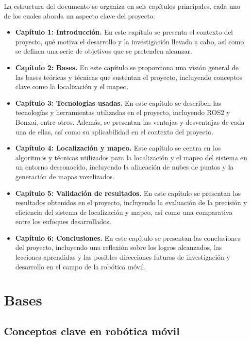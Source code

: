 \documentclass[12pt, a4paper, twoside]{article}
\begin{document}
La estructura del documento se organiza en seis capítulos principales, cada uno de los cuales aborda un aspecto clave del proyecto:
\begin{itemize}
  \item \textbf{Capítulo 1: Introducción.} En este capítulo se presenta el contexto del proyecto, qué motiva el 
    desarrollo y la investigación llevada a cabo, así como se definen una serie de objetivos que se pretenden alcanzar.
  \item \textbf{Capítulo 2: Bases.} En este capítulo se proporciona una visión general de las bases teóricas y 
    técnicas que sustentan el proyecto, incluyendo conceptos clave como la localización y el mapeo.
  \item \textbf{Capítulo 3: Tecnologías usadas.} En este capítulo se describen las tecnologías y herramientas utilizadas 
    en el proyecto, incluyendo ROS2\cite{doi:10.1126/scirobotics.abm6074} y Bonxai\cite{faconti2024bonxai}, entre otros. 
    Además, se presentan las ventajas y desventajas de cada una de ellas, así como su aplicabilidad en el contexto del proyecto.
  \item \textbf{Capítulo 4: Localización y mapeo.} Este capítulo se centra en los algoritmos y técnicas utilizados para 
    la localización y el mapeo del sistema en un entorno desconocido, incluyendo la alineación de nubes de puntos y la generación 
    de mapas voxelizados.
  \item \textbf{Capítulo 5: Validación de resultados.} En este capítulo se presentan los resultados obtenidos en el proyecto, 
    incluyendo la evaluación de la precisión y eficiencia del sistema de localización y mapeo, así como una comparativa entre 
    los enfoques desarrollados.
  \item \textbf{Capítulo 6: Conclusiones.} En este capítulo se presentan las conclusiones del proyecto, incluyendo una reflexión 
    sobre los logros alcanzados, las lecciones aprendidas y las posibles direcciones futuras de investigación y desarrollo en el 
    campo de la robótica móvil.
\end{itemize}
\newpage

\section{Bases}

\subsection{Conceptos clave en robótica móvil}
\end{document}
